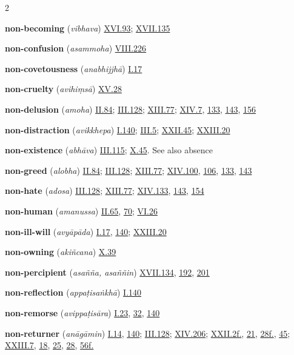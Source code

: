 \begin{multicols}{2}
\begin{vismHanging}
\par\textbf{non-becoming} (\emph{vibhava}) \hyperlink{XVI.93}{XVI.93}{}; \hyperlink{XVII.135}{XVII.135}{}
\par\textbf{non-confusion} (\emph{asammoha}) \hyperlink{VIII.226}{VIII.226}{}
\par\textbf{non-covetousness} (\emph{anabhijjhā}) \hyperlink{I.17}{I.17}{}
\par\textbf{non-cruelty} (\emph{avihiṃsā}) \hyperlink{XV.28}{XV.28}{}
\par\textbf{non-delusion} (\emph{amoha}) \hyperlink{II.84}{II.84}{}; \hyperlink{III.128}{III.128}{}; \hyperlink{XIII.77}{XIII.77}{}; \hyperlink{XIV.7}{XIV.7}{}, \hyperlink{XIV.133}{133}{}, \hyperlink{XIV.143}{143}{}, \hyperlink{XIV.156}{156}{}
\par\textbf{non-distraction} (\emph{avikkhepa}) \hyperlink{I.140}{I.140}{}; \hyperlink{III.5}{III.5}{}; \hyperlink{XXII.45}{XXII.45}{}; \hyperlink{XXIII.20}{XXIII.20}{}
\par\textbf{non-existence} (\emph{abhāva}) \hyperlink{III.115}{III.115}{}; \hyperlink{X.45}{X.45}{}. See also absence 
\par\textbf{non-greed} (\emph{alobha}) \hyperlink{II.84}{II.84}{}; \hyperlink{III.128}{III.128}{}; \hyperlink{XIII.77}{XIII.77}{}; \hyperlink{XIV.100}{XIV.100}{}, \hyperlink{XIV.106}{106}{}, \hyperlink{XIV.133}{133}{}, \hyperlink{XIV.143}{143}{}
\par\textbf{non-hate} (\emph{adosa}) \hyperlink{III.128}{III.128}{}; \hyperlink{XIII.77}{XIII.77}{}; \hyperlink{XIV.133}{XIV.133}{}, \hyperlink{XIV.143}{143}{}, \hyperlink{XIV.154}{154}{}
\par\textbf{non-human} (\emph{amanussa}) \hyperlink{II.65}{II.65}{}, \hyperlink{II.70}{70}{}; \hyperlink{VI.26}{VI.26}{}
\par\textbf{non-ill-will} (\emph{avyāpāda}) \hyperlink{I.17}{I.17}{}, \hyperlink{I.140}{140}{}; \hyperlink{XXIII.20}{XXIII.20}{}
\par\textbf{non-owning} (\emph{akiñcana}) \hyperlink{X.39}{X.39}{}
\par\textbf{non-percipient} (\emph{asañña, asaññin}) \hyperlink{XVII.134}{XVII.134}{}, \hyperlink{XVII.192}{192}{}, \hyperlink{XVII.201}{201}{}
\par\textbf{non-reflection} (\emph{appaṭisaṅkhā}) \hyperlink{I.140}{I.140}{}
\par\textbf{non-remorse} (\emph{avippaṭisāra}) \hyperlink{I.23}{I.23}{}, \hyperlink{I.32}{32}{}, \hyperlink{I.140}{140}{}
\par\textbf{non-returner} (\emph{anāgāmin}) \hyperlink{I.14}{I.14}{}, \hyperlink{I.140}{140}{}; \hyperlink{III.128}{III.128}{}; \hyperlink{XIV.206}{XIV.206}{}; \hyperlink{XXII.2}{XXII.2f.}{}, \hyperlink{XXII.21}{21}{}, \hyperlink{XXII.28}{28f.}{}, \hyperlink{XXII.45}{45}{}; \hyperlink{XXIII.7}{XXIII.7}{}, \hyperlink{XXIII.18}{18}{}, \hyperlink{XXIII.25}{25}{}, \hyperlink{XXIII.28}{28}{}, \hyperlink{XXIII.56}{56f.}{}

\end{vismHanging}
\end{multicols}
